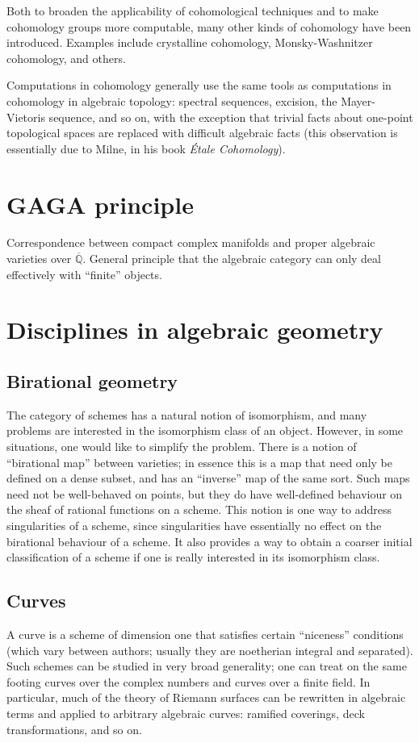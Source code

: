 \documentclass[12pt]{article}
\newcommand{\sect}[1]{\clearpage\section*{#1}}
\begin{document}
Both to broaden the applicability of cohomological techniques and to make cohomology groups more computable, many other kinds of cohomology have been introduced.  Examples include crystalline cohomology, Monsky-Washnitzer cohomology, and others. 

Computations in cohomology generally use the same tools as computations in cohomology in algebraic topology: spectral sequences, excision, the Mayer-Vietoris sequence, and so on, with the exception that trivial facts about one-point topological spaces are replaced with difficult algebraic facts (this observation is essentially due to Milne, in his book \emph{\'Etale Cohomology}).

\sect{GAGA principle}

Correspondence between compact complex manifolds and proper algebraic varieties over $\overline{\mathbb{Q}}$.  General principle that the algebraic category can only deal effectively with ``finite'' objects.

\sect{Disciplines in algebraic geometry}

\subsection*{Birational geometry}

The category of schemes has a natural notion of isomorphism, and many problems are interested in the isomorphism class of an object.  However, in some situations, one would like to simplify the problem.  There is a notion of ``birational map'' between varieties; in essence this is a map that need only be defined on a dense subset, and has an ``inverse'' map of the same sort.  Such maps need not be well-behaved on points, but they do have well-defined behaviour on the sheaf of rational functions on a scheme.  This notion is one way to address singularities of a scheme, since singularities have essentially no effect on the birational behaviour of a scheme.  It also provides a way to obtain a coarser initial classification of a scheme if one is really interested in its isomorphism class.

\subsection*{Curves}

A curve is a scheme of dimension one that satisfies certain ``niceness'' conditions (which vary between authors; usually they are noetherian integral and separated). Such schemes can be studied in very broad generality; one can treat on the same footing curves over the complex numbers and curves over a finite field.  In particular, much of the theory of Riemann surfaces can be rewritten in algebraic terms and applied to arbitrary algebraic curves: ramified coverings, deck transformations, and so on. 
\end{document}
